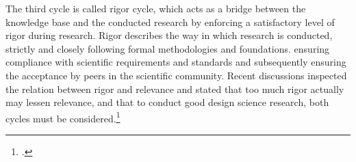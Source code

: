 The third cycle is called rigor cycle, which acts as a bridge between the knowledge base and the conducted research by enforcing a satisfactory level of rigor during research. Rigor describes the way in which research is conducted, strictly and closely following formal methodologies and foundations. ensuring compliance with scientific requirements and standards and subsequently ensuring the acceptance by peers in the scientific community. Recent discussions inspected the relation between rigor and relevance and stated that too much rigor actually may lessen relevance, and that to conduct good design science research, both cycles must be considered.\footcites[Cf.][p.5]{BenbasatEmpiricalresearchinformation1999}[cf.][p.88]{HevnerDesignScienceResearch2004}[cf.][p.130]{ThomasBekannteundweniger2014}[cf.][p.91]{Hevnerthreecycleview2007}
